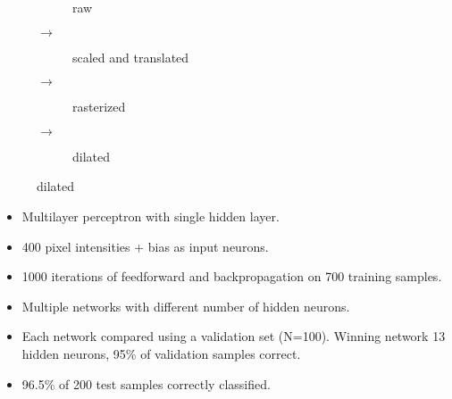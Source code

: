 \documentclass[landscape,paper=160mm:90mm,fontsize=10pt,DIV=16]{scrartcl}
\begin{document}
\begin{figure}[h]
    \centering
    \begin{subfigure}[t]{0.20\textwidth}
        \resizebox{\textwidth}{!}{}
        \caption{raw}
    \end{subfigure}%
    {$\rightarrow$}
    \begin{subfigure}[t]{0.2\textwidth}
        \resizebox{\textwidth}{!}{}
        \caption{scaled and translated}
    \end{subfigure}
    {$\rightarrow$}
    \begin{subfigure}[t]{0.20\textwidth}
        \hspace*{4mm}
        \vfill
        \caption{rasterized}
    \end{subfigure}%
    {$\rightarrow$}
    \begin{subfigure}[t]{0.20\textwidth}
        \centering
        \hspace*{1mm}
        \vfill
        \caption{dilated}
    \end{subfigure}
\end{figure}
\hspace*{-8mm}
\begin{minipage}{0.5\textwidth}
    \begin{itemize}
        \item Multilayer perceptron with single hidden layer.
        \item 400 pixel intensities + bias as input neurons.
        \item 1000 iterations of feedforward and backpropagation on 700
            training samples.
    \end{itemize}
\end{minipage}
\begin{minipage}{0.5\textwidth}
    \begin{itemize}
        \item Multiple networks with different number of hidden neurons.
        \item Each network compared using a validation set (N=100). Winning
            network 13 hidden neurons, 95\% of validation samples correct.
        \item 96.5\% of 200 test samples correctly classified.
    \end{itemize}
\end{minipage}
\end{document}
